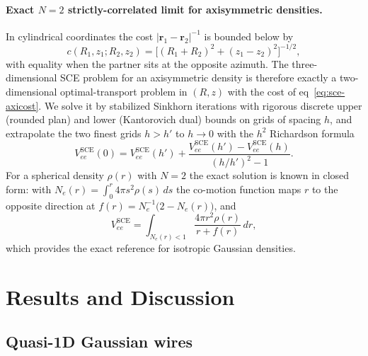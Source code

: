 \documentclass[journal=jctcce,manuscript=article]{achemso}
\begin{document}
\paragraph{Exact $N=2$ strictly-correlated limit for axisymmetric densities.}
In cylindrical coordinates the cost $|\mathbf r_1-\mathbf r_2|^{-1}$ is
bounded below by
\begin{equation}
c(R_1,z_1;R_2,z_2)=\bigl[(R_1+R_2)^2+(z_1-z_2)^2\bigr]^{-1/2},
\label{eq:sce-axicost}
\end{equation}
with equality when the partner sits at the opposite azimuth.  The
three-dimensional SCE problem for an axisymmetric density is therefore exactly a
two-dimensional optimal-transport problem in $(R,z)$ with the cost of
eq~\ref{eq:sce-axicost}.  We solve it by stabilized Sinkhorn iterations with
rigorous discrete upper (rounded plan) and lower (Kantorovich dual) bounds on
grids of spacing $h$, and extrapolate the two finest grids $h>h'$ to $h\to0$ with
the $h^2$ Richardson formula
\begin{equation}
V_{ee}^{\mathrm{SCE}}(0)=V_{ee}^{\mathrm{SCE}}(h')+\frac{V_{ee}^{\mathrm{SCE}}(h')-V_{ee}^{\mathrm{SCE}}(h)}{(h/h')^2-1}.
\label{eq:sce-extrap}
\end{equation}
For a spherical density $\rho(r)$ with $N=2$ the exact solution is known in
closed form: with $N_e(r)=\int_0^r4\pi s^2\rho(s)\,ds$ the co-motion function
maps $r$ to the opposite direction at $f(r)=N_e^{-1}\bigl(2-N_e(r)\bigr)$, and
\begin{equation}
V_{ee}^{\mathrm{SCE}}=\int_{N_e(r)<1}\frac{4\pi r^2\rho(r)}{r+f(r)}\,dr,
\label{eq:sce-radial}
\end{equation}
which provides the exact reference for isotropic Gaussian densities.

\section{Results and Discussion}
\label{sec:results}

\subsection{Quasi-1D Gaussian wires}
\label{sec:wire}
\end{document}
